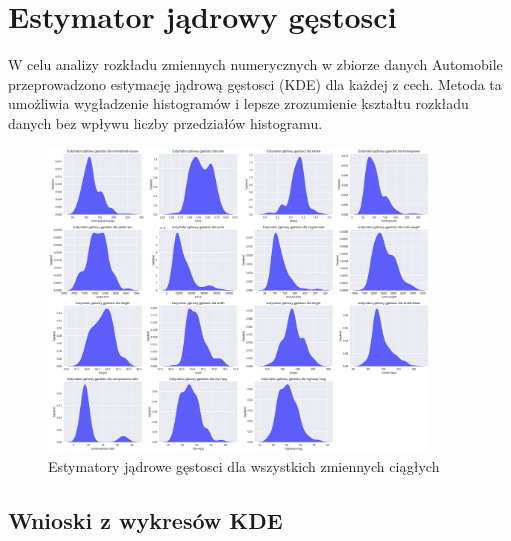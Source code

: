 \documentclass[12pt,a4paper]{article}
\begin{document}
\section{Estymator jądrowy gęstosci}

W celu analizy rozkładu zmiennych numerycznych w zbiorze danych Automobile przeprowadzono estymację jądrową gęstosci (KDE) dla każdej z cech. Metoda ta umożliwia wygładzenie histogramów i lepsze zrozumienie kształtu rozkładu danych bez wpływu liczby przedziałów histogramu.

\begin{figure}[H]
    \centering
    \includegraphics[width=0.9\textwidth]{figures/kde_plots_all_variables.png}
    \caption{Estymatory jądrowe gęstosci dla wszystkich zmiennych ciągłych}
    \label{fig:kde_plots_all_variables}
\end{figure}

\subsection{Wnioski z wykresów KDE}
\end{document}
